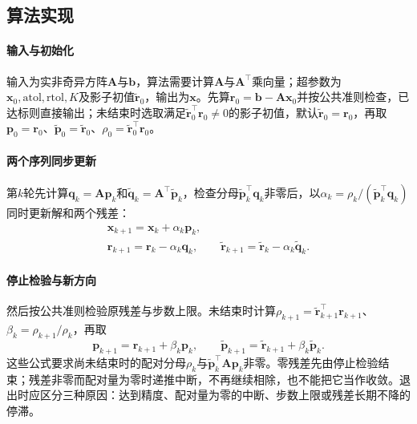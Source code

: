\subsection{算法实现}

\paragraph{输入与初始化}
输入为实非奇异方阵$\bm A$与$\bm b$，算法需要计算$\bm A$与$\bm A^\top$乘向量；超参数为$\bm x_0,\mathrm{atol},\mathrm{rtol},K$及影子初值$\widetilde{\bm r}_0$，输出为$\bm x$。先算$\bm r_0=\bm b-\bm A\bm x_0$并按公共准则检查，已达标则直接输出；未结束时选取满足$\widetilde{\bm r}_0^\top\bm r_0\ne0$的影子初值，默认$\widetilde{\bm r}_0=\bm r_0$，再取$\bm p_0=\bm r_0$、$\widetilde{\bm p}_0=\widetilde{\bm r}_0$、$\rho_0=\widetilde{\bm r}_0^\top\bm r_0$。

\paragraph{两个序列同步更新}
第$k$轮先计算$\bm q_k=\bm A\bm p_k$和$\widetilde{\bm q}_k=\bm A^\top\widetilde{\bm p}_k$，检查分母$\widetilde{\bm p}_k^\top\bm q_k$非零后，以$\alpha_k=\rho_k/(\widetilde{\bm p}_k^\top\bm q_k)$同时更新解和两个残差：
\[
 \begin{gathered}
 \bm x_{k+1}=\bm x_k+\alpha_k\bm p_k,\\
 \bm r_{k+1}=\bm r_k-\alpha_k\bm q_k,\qquad
 \widetilde{\bm r}_{k+1}=\widetilde{\bm r}_k-\alpha_k\widetilde{\bm q}_k .
 \end{gathered}
\]

\paragraph{停止检验与新方向}
然后按公共准则检验原残差与步数上限。未结束时计算$\rho_{k+1}=\widetilde{\bm r}_{k+1}^\top\bm r_{k+1}$、$\beta_k=\rho_{k+1}/\rho_k$，再取
\[
 \bm p_{k+1}=\bm r_{k+1}+\beta_k\bm p_k,\qquad
 \widetilde{\bm p}_{k+1}=\widetilde{\bm r}_{k+1}+\beta_k\widetilde{\bm p}_k .
\]
这些公式要求尚未结束时的配对分母$\rho_k$与$\widetilde{\bm p}_k^\top\bm A\bm p_k$非零。零残差先由停止检验结束；残差非零而配对量为零时递推中断，不再继续相除，也不能把它当作收敛。退出时应区分三种原因：达到精度、配对量为零的中断、步数上限或残差长期不降的停滞。

